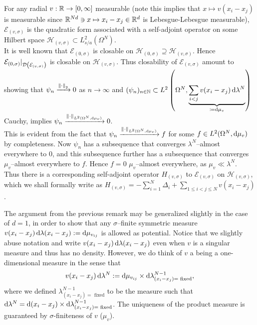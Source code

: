 \begin{remark} \label{RemarkdDimPotentialAllowed}
	For any radial $ v:\mathbb{R}\to [0,\infty] $ measurable (note this implies that $ x\mapsto v(x_i-x_j) $ is measurable since $ \mathbb{R}^{Nd} \ni x\mapsto x_i-x_j\in \mathbb{R}^d $ is Lebesgue-Lebesgue measurable),  $\mathcal{E}_{(v,\sigma)} $ is the quadratic form associated with a self-adjoint operator on some Hilbert space $ \mathcal{H}_{(v,\sigma)}\subset L^2_{s/a}(\Omega^N) $.\\
	It is well known that $\mathcal{E}_{(0,\sigma)}$ is closable on $ \mathcal{H}_{(0,\sigma)}\supseteq \mathcal{H}_{(v,\sigma)}    $. Hence $ \mathcal{E}_{(0,\sigma)}\lvert_{\mathcal D\left(\mathcal{E}_{(v,\sigma)}\right)} $ is closable on $  \mathcal{H}_{(v,\sigma)} $. Thus closability of $ \mathcal{E}_{(v,\sigma)} $ amount to showing that $ \psi_n \xrightarrow{\left\lVert \cdot \right\rVert_2}0 $ as $ n\to\infty $ and $ (\psi_n)_{n\in\mathbb{N}}\subset L^2\left(\Omega^N,\underbrace{\sum_{i<j}v(x_i-x_j)\mathop{}\!\mathrm{d}\lambda^{N}}_{\coloneqq \mathop{}\!\mathrm{d}\mu_v}\right) $ Cauchy, implies $ \psi_n\xrightarrow{\left\lVert \cdot \right\rVert_{L^2(\Omega^N,\mathop{}\!\mathrm{d}\mu_v)}}0  $. \\
	This is evident from the fact that $\psi_n\xrightarrow{\left\lVert \cdot \right\rVert_{L^2(\Omega^N,\mathop{}\!\mathrm{d}\mu_v)}}f$ for some $ f\in L^2(\Omega^N,\mathop{}\!\mathrm{d}\mu_v) $ by completeness. Now $ \psi_n $ has a subsequence that converges $ \lambda^{N} $--almost everywhere to $ 0 $, and this subsequence further has a subsequence that converges $ \mu_v $--almost everywhere to $ f $. Hence $ f=0 $ $ \mu_v $--almost everywhere, as $ \mu_v\ll \lambda^N $. \\
	Thus there is a corresponding self-adjoint operator $ H_{(v,\sigma)} $ to $ \mathcal{E}_{(v,\sigma)} $ on $ \mathcal{H}_{(v,\sigma)} $, which we shall formally write as $ H_{(v,\sigma)}=-\sum_{i=1}^{N}\Delta_i+\sum_{1\leq i<j\leq N}v(x_i-x_j) $.
\end{remark}
The argument from the previous remark may be generalized slightly in the case of $ d=1 $, in order to show that any $ \sigma $--finite symmetric measure $ v(x_i-x_j)\mathop{}\!\mathrm{d}\lambda(x_i-x_j):=\mathop{}\!\mathrm{d}\mu_{v_{ij}} $ is allowed as potential. Notice that we slightly abuse notation and write $  v(x_i-x_j)\mathop{}\!\mathrm{d}\lambda(x_i-x_j) $ even when $ v $ is a singular measure and thus has no density. However, we do think of $ v $ a being a one-dimensional measure in the sense that 
$$ v(x_i-x_j)\mathop{}\!\mathrm{d}\lambda^N:=\mathop{}\!\mathrm{d}\mu_{v_{ij}}\times \mathop{}\!\mathrm{d} \lambda^{N-1}_{(x_i-x_j)=\text{ fixed}},  $$ 
where we defined $ \lambda^{N-1}_{(x_i-x_j)=\text{ fixed}} $ to be the measure such that $ \mathop{}\!\mathrm{d}\lambda^{N}=\mathop{}\!\mathrm{d}(x_i-x_j)\times \mathop{}\!\mathrm{d}\lambda^{N-1}_{(x_i-x_j)=\text{ fixed}} $. The uniqueness of the product measure is guaranteed by $ \sigma $-finiteness of $ v $ ($ \mu_v $).
